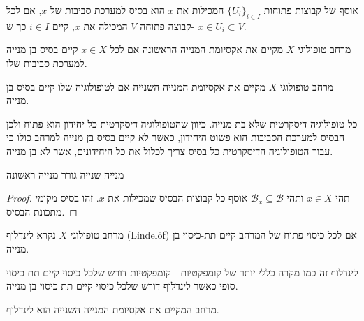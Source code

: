 \documentclass{tstextbook}
\begin{document}
\begin{definition}
אוסף של קבוצות פתוחות \(\{U_i\}_{i \in I}\) המכילות את \(x\) הוא בסיס למערכת סביבות של \(x\), אם לכל קבוצה פתוחה \(V\) המכילה את \(x\), קיים \(i \in I\) כך ש- \(x \in U_i \subset V\).

\end{definition}
\begin{definition}
מרחב טופולוגי \(X\) מקיים את אקסיומת המנייה הראשונה אם לכל \(x \in X\) קיים בסיס בן מנייה למערכת סביבות שלו.

\end{definition}
\begin{definition}
מרחב טופולוגי \(X\) מקיים את אקסיומת המנייה השנייה אם לטופולוגיה שלו קיים בסיס בן מנייה.

\end{definition}
\begin{example}
כל טופולוגיה דיסקרטית שלא בת מנייה. כיוון שהטופולוגיה דיסקרטית כל יחידון הוא פתוח ולכן הבסיס למערכת הסביבות הוא פשוט היחידון, כאשר לא קיים בסיס בן מנייה למרחב כולו כי עבור הטופולוגיה הדיסקרטית כל בסיס צריך לכלול את כל היחידונים, אשר לא בן מנייה.

\end{example}
\begin{lemma}
מנייה שנייה גורר מנייה ראשונה

\end{lemma}
\begin{proof}
תהי \(x \in X\) ותהי \(\mathcal{B}_{x}\subseteq \mathcal{B}\) אוסף כל קבוצות הבסיס שמכילות את \(x\). זהו בסיס מקומי מתכונת הבסיס.

\end{proof}
\begin{definition}
מרחב טופולוגי \(X\) נקרא לינדלוף (Lindelöf) אם לכל כיסוי פתוח של המרחב קיים תת-כיסוי בן מנייה.

\end{definition}
\begin{remark}
לינדלוף זה כמו מקרה כללי יותר של קומפקטיות - קומפקטיות דורש שלכל כיסוי קיים תת כיסוי סופי כאשר לינדלוף דורש שלכל כיסוי קיים תת כיסוי בן מנייה.

\end{remark}
\begin{lemma}
מרחב המקיים את אקסיומת המנייה השנייה הוא לינדלוף.

\end{lemma}
\end{document}
